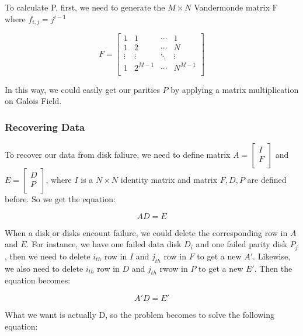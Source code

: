 \documentclass[conference]{IEEEtran}
\begin{document}
To calculate P, first, we need to generate the $M \times N$ Vandermonde matrix F where $f_{i,j} = j ^ {i-1}$

\begin{equation}
F =
\left[
\begin{matrix}
1      & 1      & \cdots & 1      \\
1      & 2      & \cdots & N      \\
\vdots & \vdots & \ddots & \vdots \\
1      & 2^{M-1}      & \cdots & N^{M-1}      \\
\end{matrix}
\right]
\end{equation}

In this way, we could easily get our parities $P$ by applying a matrix multiplication on Galois Field.

\subsubsection{Recovering Data}

To recover our data from disk faliure, we need to define matrix $A = \left[\begin{matrix}I \\F \\\end{matrix}\right]$ and $E= \left[\begin{matrix}D \\P \\\end{matrix}\right]$, where $I$ is a $N \times N$ identity matrix and matrix $F, D, P$ are defined before. So we get the equation:

\begin{equation}
	AD=E
\end{equation}

When a disk or disks encount failure, we could delete the corresponding row in $A$ and $E$. For instance, we have one failed data disk $D_i$ and one failed parity disk $P_j$, then we need to delete $i_{th}$ row in $I$ and $j_{th}$ row in $F$ to get a new $A'$. Likewise, we also need to delete $i_{th}$ row in $D$ and $j_{th}$ rwow in $P$ to get a new $E'$. Then the equation becomes: 

\begin{equation}
	A'D=E'
\end{equation}

What we want is actually D, so the problem becomes to solve the following equation:
\end{document}
